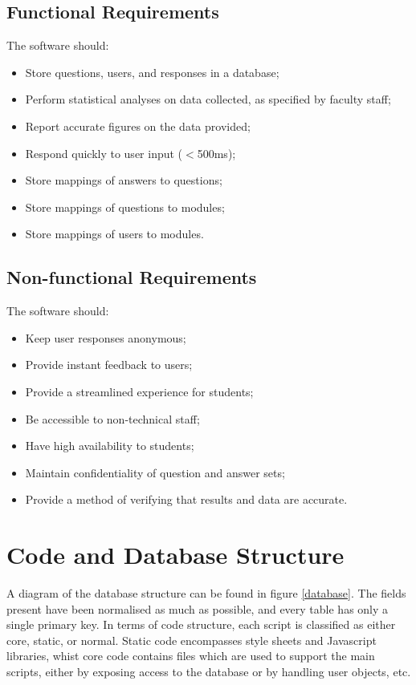 \documentclass[12pt,a4paper,twoside]{report}
\begin{document}
\subsection{Functional Requirements}
The software should:
\begin{itemize}
	\item Store questions, users, and responses in a database;
	\item Perform statistical analyses on data collected, as specified by faculty staff;
	\item Report accurate figures on the data provided;
	\item Respond quickly to user input ($<$500ms);
	\item Store mappings of answers to questions;
	\item Store mappings of questions to modules;
	\item Store mappings of users to modules.
\end{itemize}
\subsection{Non-functional Requirements}
The software should:
\begin{itemize}
	\item Keep user responses anonymous;
	\item Provide instant feedback to users;
	\item Provide a streamlined experience for students;
	\item Be accessible to non-technical staff;
	\item Have high availability to students;
	\item Maintain confidentiality of question and answer sets;
	\item Provide a method of verifying that results and data are accurate.
\end{itemize}

\section{Code and Database Structure}
A diagram of the database structure can be found in figure \ref{database}. The fields present have been normalised as much as possible, and every table has only a single primary key. In terms of code structure, each script is classified as either core, static, or normal. Static code encompasses style sheets and Javascript libraries, whist core code contains files which are used to support the main scripts, either by exposing access to the database or by handling user objects, etc. 
\end{document}
